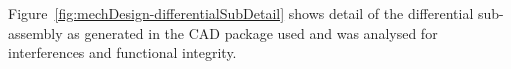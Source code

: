       \\\\
        Figure~\ref{fig:mechDesign-differentialSubDetail} shows detail of the differential sub-assembly as generated in the CAD package used and was analysed for interferences and functional integrity.
        
        \begin{figure}[H]
        \centering
        \qquad
        \subfloat[\label{fig:mechDesign-differentialSubDetail-b}]{
}
\end{figure}

